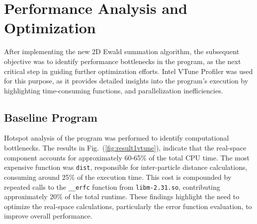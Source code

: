 
\chapter{Performance Analysis and Optimization}

\label{Chapter4}

After implementing the new 2D Ewald summation algorithm, the subsequent objective was to identify performance bottlenecks in the program, as the next critical step in guiding further optimization efforts. Intel VTune Profiler was used for this purpose, as it provides detailed insights into the program’s execution by highlighting time-consuming functions, and parallelization inefficiencies.


\section{Baseline Program}


Hotspot analysis of the program was performed to identify computational bottlenecks. The results in Fig.~(\ref{fig:result1vtune}), indicate that the real-space component accounts for approximately 60-65\% of the total CPU time. The most expensive function was \texttt{dist}, responsible for inter-particle distance calculations, consuming around 25\% of the execution time. This cost is compounded by repeated calls to the \texttt{\_\_erfc} function from \texttt{libm-2.31.so}, contributing approximately 20\% of the total runtime. These findings highlight the need to optimize the real-space calculations, particularly the error function evaluation, to improve overall performance.


